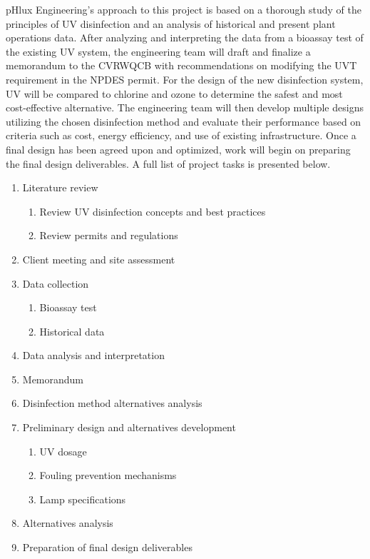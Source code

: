 \documentclass[11pt,letterpaper,final]{report}
\begin{document}
pHlux Engineering’s approach to this project is based on a thorough study of the principles of UV disinfection and an analysis of historical and present plant operations data. After analyzing and interpreting the data from a bioassay test of the existing UV system, the engineering team will draft and finalize a memorandum to the CVRWQCB with recommendations on modifying the UVT requirement in the NPDES permit. For the design of the new disinfection system, UV will be compared to chlorine and ozone to determine the safest and most cost-effective alternative. The engineering team will then develop multiple designs utilizing the chosen disinfection method and evaluate their performance based on criteria such as cost, energy efficiency, and use of existing infrastructure. Once a final design has been agreed upon and optimized, work will begin on preparing the final design deliverables. A full list of project tasks is presented below.


\begin{enumerate}[topsep=0pt,itemsep=-0ex,partopsep=0ex,parsep=0ex]
    \item Literature review
    \begin{enumerate}[topsep=0pt,itemsep=-0ex,partopsep=0ex,parsep=0ex]
            \item Review UV disinfection concepts and best practices
            \item Review permits and regulations
    \end{enumerate}
    \item Client meeting and site assessment
    \item Data collection
    \begin{enumerate}[topsep=0pt,itemsep=-0ex,partopsep=0ex,parsep=0ex]
        \item  Bioassay test
        \item Historical data
    \end{enumerate}
    \item Data analysis and interpretation
    \item Memorandum
    \item Disinfection method alternatives analysis
    \item Preliminary design and alternatives development
    \begin{enumerate}[topsep=0pt,itemsep=-0ex,partopsep=0ex,parsep=0ex]
        \item UV dosage
        \item Fouling prevention mechanisms
        \item Lamp specifications
    \end{enumerate}
    \item Alternatives analysis
    \item Preparation of final design deliverables
\end{enumerate}
\end{document}
